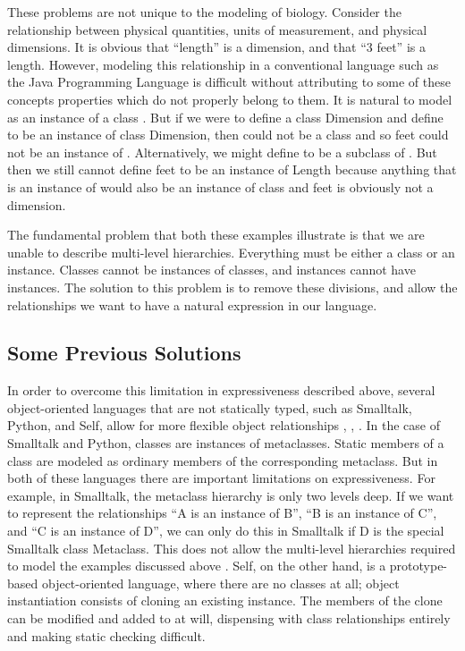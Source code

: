 \documentclass[nocopyrightspace,10pt]{acm-sigplan}
\begin{document}
These problems are not unique to the modeling of biology.  Consider
the relationship between physical quantities, units of measurement,
and physical dimensions. It is obvious that ``length'' is a dimension,
and that ``3 feet'' is a length.  However, modeling this relationship
in a conventional language such as the Java Programming Language is
difficult without attributing to some of these concepts properties
which do not properly belong to them.  It is natural to model {} as an instance of a class {}. But if we were to
define a class {\txt Dimension} and define {} to be an
instance of class {\txt Dimension}, then {} could not be a
class and so { feet} could not be an instance of {}.
Alternatively, we might define {} to be a subclass of
{}. But then we still cannot define { feet} to be
an instance of {\txt Length} because anything that is an instance of
{} would also be an instance of class {}
and { feet} is obviously not a dimension. 

The fundamental problem that both these examples illustrate is that we
are unable to describe multi-level  hierarchies.
Everything must be either a class or an instance.  Classes cannot be
instances of classes, and instances cannot have instances.  The
solution to this problem is to remove these divisions, and allow
the relationships we want to have a natural expression in our
language.

\subsection{Some Previous Solutions}
In order to overcome this limitation in expressiveness described
above, several object-oriented languages that are not statically
typed, such as Smalltalk, Python, and Self, allow for more flexible
object relationships \cite{Smalltalk80}, \cite{ArtMOP},
\cite{PythonMeta}. In the case of Smalltalk and Python, classes are
instances of metaclasses. Static members of a class are modeled as
ordinary members of the corresponding metaclass.  But in both of these
languages there are important limitations on expressiveness.  For
example, in Smalltalk, the metaclass hierarchy is only two levels
deep.  If we want to represent the relationships ``{\txt A} is an
instance of {\txt B}'', ``{\txt B} is an instance of {\txt C}'', and
``{\txt C} is an instance of {\txt D}'', we can only do this in
Smalltalk if {\txt D} is the special Smalltalk class {\txt Metaclass}.
This does not allow the multi-level hierarchies required to model the
examples discussed above \cite{Smalltalk80}.  Self, on the other hand,
is a prototype-based object-oriented language, where there are no
classes at all; object instantiation consists of cloning an existing
instance.  The members of the clone can be modified and added to at
will, dispensing with class relationships entirely and making static
checking difficult.
\end{document}
